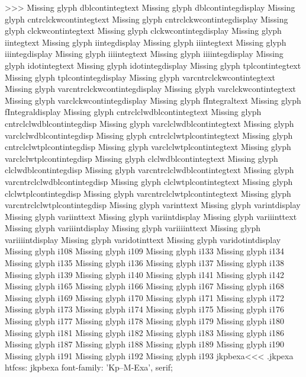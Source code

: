 >>>
Missing glyph	dblcontintegtext
Missing glyph	dblcontintegdisplay
Missing glyph	cntrclckwcontintegtext
Missing glyph	cntrclckwcontintegdisplay
Missing glyph	clckwcontintegtext
Missing glyph	clckwcontintegdisplay
Missing glyph	iintegtext
Missing glyph	iintegdisplay
Missing glyph	iiintegtext
Missing glyph	iiintegdisplay
Missing glyph	iiiintegtext
Missing glyph	iiiintegdisplay
Missing glyph	idotintegtext
Missing glyph	idotintegdisplay
Missing glyph	tplcontintegtext
Missing glyph	tplcontintegdisplay
Missing glyph	varcntrclckwcontintegtext
Missing glyph	varcntrclckwcontintegdisplay
Missing glyph	varclckwcontintegtext
Missing glyph	varclckwcontintegdisplay
Missing glyph	fIntegraltext
Missing glyph	fIntegraldisplay
Missing glyph	cntrclclwdblcontintegtext
Missing glyph	cntrclclwdblcontintegdisp
Missing glyph	varclclwdblcontintegtext
Missing glyph	varclclwdblcontintegdisp
Missing glyph	cntrclclwtplcontintegtext
Missing glyph	cntrclclwtplcontintegdisp
Missing glyph	varclclwtplcontintegtext
Missing glyph	varclclwtplcontintegdisp
Missing glyph	clclwdblcontintegtext
Missing glyph	clclwdblcontintegdisp
Missing glyph	varcntrclclwdblcontintegtext
Missing glyph	varcntrclclwdblcontintegdisp
Missing glyph	clclwtplcontintegtext
Missing glyph	clclwtplcontintegdisp
Missing glyph	varcntrclclwtplcontintegtext
Missing glyph	varcntrclclwtplcontintegdisp
Missing glyph	varinttext
Missing glyph	varintdisplay
Missing glyph	variinttext
Missing glyph	variintdisplay
Missing glyph	variiinttext
Missing glyph	variiintdisplay
Missing glyph	variiiinttext
Missing glyph	variiiintdisplay
Missing glyph	varidotinttext
Missing glyph	varidotintdisplay
Missing glyph	i108
Missing glyph	i109
Missing glyph	i133
Missing glyph	i134
Missing glyph	i135
Missing glyph	i136
Missing glyph	i137
Missing glyph	i138
Missing glyph	i139
Missing glyph	i140
Missing glyph	i141
Missing glyph	i142
Missing glyph	i165
Missing glyph	i166
Missing glyph	i167
Missing glyph	i168
Missing glyph	i169
Missing glyph	i170
Missing glyph	i171
Missing glyph	i172
Missing glyph	i173
Missing glyph	i174
Missing glyph	i175
Missing glyph	i176
Missing glyph	i177
Missing glyph	i178
Missing glyph	i179
Missing glyph	i180
Missing glyph	i181
Missing glyph	i182
Missing glyph	i183
Missing glyph	i186
Missing glyph	i187
Missing glyph	i188
Missing glyph	i189
Missing glyph	i190
Missing glyph	i191
Missing glyph	i192
Missing glyph	i193
\<jkpbexa\><<<
.jkpexa
htfcss:  jkpbexa  font-family: 'Kp--M-Exa', serif;

